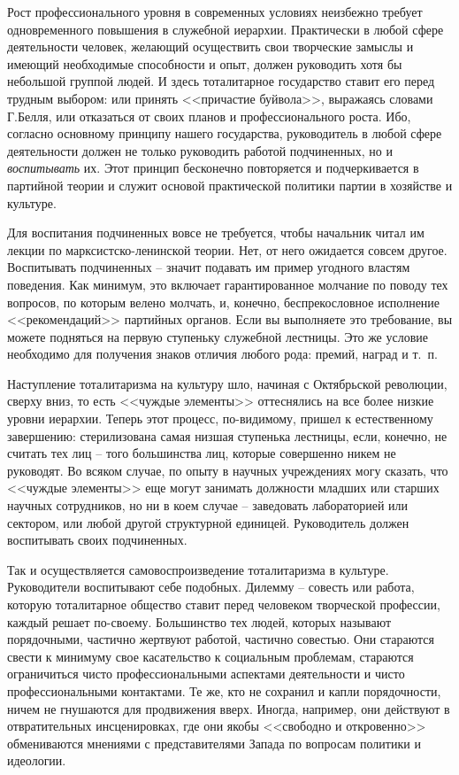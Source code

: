 \documentclass{book}
\begin{document}
Рост профессионального уровня в современных условиях неизбежно требует одновременного повышения в служебной иерархии. Практически в любой сфере деятельности человек, желающий осуществить свои творческие замыслы и имеющий необходимые способности и опыт, должен руководить хотя бы небольшой группой людей. И здесь тоталитарное государство ставит его перед трудным выбором: или принять <<причастие буйвола>>, выражаясь словами Г.Белля, или отказаться от своих планов и профессионального роста. Ибо, согласно основному принципу нашего государства, руководитель в любой сфере деятельности должен не только руководить работой подчиненных, но и \textit{воспитывать} их. Этот принцип бесконечно повторяется и подчеркивается в партийной теории и служит основой практической политики партии в хозяйстве и культуре.

Для воспитания подчиненных вовсе не требуется, чтобы начальник читал им лекции по марксистско-ленинской теории. Нет, от него ожидается совсем другое. Воспитывать подчиненных -- значит подавать им пример угодного властям поведения. Как минимум, это включает гарантированное молчание по пово­ду тех вопросов, по которым велено молчать, и, конечно, беспрекословное исполнение <<рекомендаций>> партийных органов. Если вы выполняете это требование, вы можете подняться на первую ступеньку служебной лестницы. Это же условие необходимо для получения знаков отличия любого рода: премий, наград и т.~п.

Наступление тоталитаризма на культуру шло, начиная с Октябрьской революции, сверху вниз, то есть <<чуждые элементы>> оттеснялись на все более низкие уровни иерархии. Теперь этот процесс, по-видимому, пришел к естественному завершению: стерилизована самая низшая ступенька лестницы, если, конечно, не считать тех лиц -- того большинства лиц, которые совершенно никем не руководят. Во всяком случае, по опыту в научных учреждениях могу сказать, что <<чуждые элементы>> еще могут занимать должности младших или старших научных сотрудников, но ни в коем случае -- заведовать лабораторией или сектором, или любой другой структурной единицей. Руководитель должен воспитывать своих подчиненных.

Так и осуществляется самовоспроизведение тоталитаризма в культуре. Руководители воспитывают себе подобных.
Дилемму -- совесть или работа, которую тоталитарное общество ставит перед человеком творческой профессии, каждый решает по-своему. Большинство тех людей, которых называют порядочными, частично жертвуют работой, частично совестью. Они стараются свести к минимуму свое касательство к социальным проблемам, стараются ограничиться чисто профессиональными аспектами деятельности и чисто профессиональными контактами. Те же, кто не сохранил и капли порядочности, ничем не гнушаются для продвижения вверх. Иногда, например, они действуют в отвратительных инсценировках, где они якобы <<свободно и откровенно>> обмениваются мнениями с представителями Запада по вопросам политики и идеологии.
\end{document}
